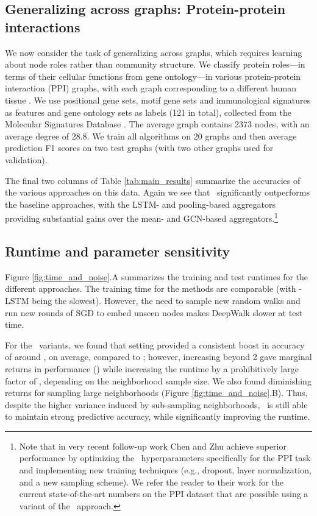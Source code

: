 \subsection{Generalizing across graphs: Protein-protein interactions}\label{inductive:sec:ppi}

We now consider the task of generalizing across graphs, which requires learning about node roles rather than community structure. 
We classify protein roles---in terms of their cellular functions from gene ontology---in various
protein-protein interaction (PPI) graphs, with each graph corresponding to a different human tissue \cite{zitnik2017tissue}.
We use positional gene sets, motif gene sets and immunological signatures as features and gene
ontology sets as labels (121 in total), collected from the Molecular Signatures Database \cite{subramanian2005gene}.
The average graph contains 2373 nodes, with an average degree of 28.8.
We train all algorithms on 20 graphs and then average prediction F1 scores on two test graphs (with two other graphs used for validation). 

The final two columns of Table \ref{tab:main_results} summarize the accuracies of the various approaches on this data.
Again we see that \name\ significantly outperforms the baseline approaches, with the LSTM- and pooling-based aggregators providing substantial gains over the mean- and GCN-based aggregators.\footnote{Note that in very recent follow-up work Chen and Zhu \cite{chen2017stochastic} achieve superior performance by optimizing the \name\ hyperparameters specifically for the PPI task and implementing new training techniques (e.g., dropout, layer normalization, and a new sampling scheme). We refer the reader to their work for the current state-of-the-art numbers on the PPI dataset that are possible using a variant of the \name\ approach.} 


\subsection{Runtime and parameter sensitivity}\label{inductive:sec:sensitivity}

Figure \ref{fig:time_and_noise}.A summarizes the training and test runtimes for the different approaches. 
The training time for the methods are comparable (with \name-LSTM being the slowest). 
However, the need to sample new random walks and run new rounds of SGD to embed unseen nodes makes DeepWalk  slower at test time. 

For the \name\ variants, we found that setting  provided a consistent boost in accuracy of around , on average, compared
to ; however, increasing  beyond 2 gave marginal returns in performance ()
while increasing the runtime by a prohibitively large factor of , depending
on the neighborhood sample size.
We also found diminishing returns for sampling large neighborhoods (Figure
\ref{fig:time_and_noise}.B).
Thus, despite
the higher variance induced by sub-sampling neighborhoods, \name\ is still able to maintain strong predictive accuracy, while significantly improving the runtime. 

